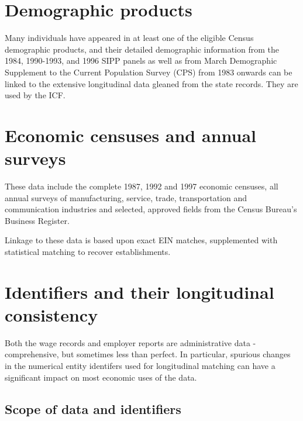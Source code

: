 \section{Demographic products}
\label{cha:Demographic}

Many individuals have appeared in at least one of the eligible Census demographic 
products, and their detailed demographic information from 
 the 1984, 1990-1993, and 1996 SIPP panels as well as
from March Demographic Supplement to the Current Population
Survey (CPS) from 1983 onwards
%
can be linked to the extensive longitudinal data gleaned from the state
records. They are used by the ICF.


%
%

\section{Economic censuses and annual surveys}

These data include the complete 1987, 1992 and 1997 economic censuses, all 
annual surveys of manufacturing, service, trade, transportation and 
communication industries and selected, approved fields from the Census 
Bureau's %
Business Register.

Linkage to these data is based upon exact EIN matches,
supplemented with statistical matching to recover
establishments. 


\section{Identifiers and their longitudinal consistency}
\label{sec:coding}


Both the wage records and employer reports are administrative data -
comprehensive, but sometimes less than perfect. In particular, spurious
changes in the numerical entity identifers used for longitudinal matching
can have a significant impact on most economic uses of the data.

\subsection{Scope of data and identifiers}
\label{sec:scope}


